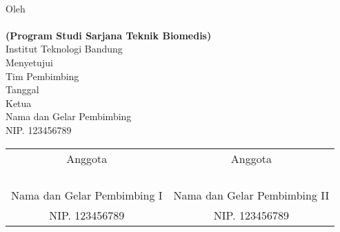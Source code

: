 \clearpage
\pagestyle{empty}

\begin{center}
    \large{\bfseries \MakeUppercase{\thetitle}}
    \\[2\baselineskip]
    
    \renewcommand{\baselinestretch}{1}
    \normalsize{Oleh\\
    	\textbf{\theauthor}\\
    	\textbf{(Program Studi Sarjana Teknik Biomedis)}
    	\\[\baselineskip]
    	Institut Teknologi Bandung}
    \\[3\baselineskip]
    
    
    \normalsize{Menyetujui\\
    	Tim Pembimbing
    	\\[\baselineskip]
    	Tanggal \thedate\\[3\baselineskip]
    	Ketua\\[4\baselineskip]
    	Nama dan Gelar Pembimbing\\
    	NIP. 123456789}
    \\[2\baselineskip]
    
    \normalsize{%
    \setlength{\tabcolsep}{12pt}
    \begin{tabular}{c@{\hskip 0.5in}c}
        Anggota & Anggota \\
        & \\
        & \\
        & \\
        & \\
        Nama dan Gelar Pembimbing I & Nama dan Gelar Pembimbing II \\
        NIP. 123456789 & NIP. 123456789 \\
    \end{tabular}
    }

\end{center}
\clearpage
